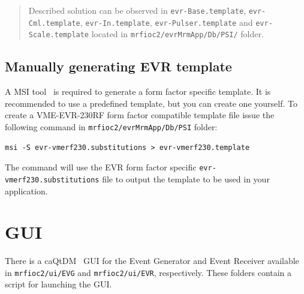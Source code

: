 \documentclass[12pt,a4paper]{article}
\let\stdsection\section
\renewcommand\section{\newpage\stdsection}
\begin{document}
\begin{quote}
Described solution can be observed in \texttt{evr-Base.template},
\texttt{evr-Cml.template}, \texttt{evr-In.template},
\texttt{evr-Pulser.template} and \texttt{evr-Scale.template} located in
\texttt{mrfioc2/evrMrmApp/Db/PSI/} folder.
\end{quote}

\subsection{Manually generating EVR template}\label{manually-generating-evr-template}
A MSI tool~\cite{msi} is required to generate a form factor specific template. It
is recommended to use a predefined template, but you can create one
yourself. To create a VME-EVR-230RF form factor compatible template file issue the following command in \texttt{mrfioc2/evrMrmApp/Db/PSI} folder:

\begin{verbatim}
msi -S evr-vmerf230.substitutions > evr-vmerf230.template 
\end{verbatim}

The command will use the EVR form factor specific \texttt{evr-vmerf230.substitutions}
file to output the template to be used in your application.






\section{GUI}\label{sec:GUI}
There is a caQtDM~\cite{caqtdm} GUI for the Event Generator and Event Receiver available in \texttt{mrfioc2/ui/EVG} and \texttt{mrfioc2/ui/EVR}, respectively. These folders contain a script for launching the GUI.
\end{document}
